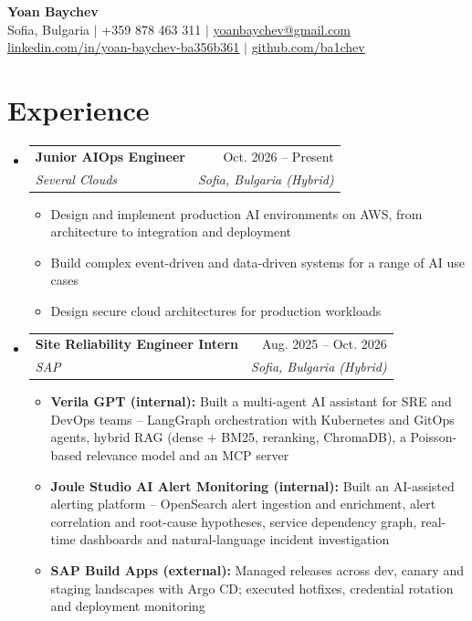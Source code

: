 \documentclass[a4paper,11pt]{article}
\makeatletter
\newcommand{\resumeItem}[1]{
  \item\small{
    {#1 \vspace{-2pt}}
  }
}
\newcommand{\resumeSubheading}[4]{
  \vspace{-2pt}\item
    \begin{tabular*}{0.97\textwidth}[t]{l@{\extracolsep{\fill}}r}
      \textbf{#1} & #2 \\
      \textit{\small#3} & \textit{\small #4} \\
    \end{tabular*}\vspace{-7pt}
}
\newcommand{\resumeSubHeadingListStart}{\begin{itemize}[leftmargin=0.15in, label={}]}
\newcommand{\resumeSubHeadingListEnd}{\end{itemize}}
\newcommand{\resumeItemListStart}{\begin{itemize}}
\newcommand{\resumeItemListEnd}{\end{itemize}\vspace{-5pt}}
\makeatother
\begin{document}
\begin{center}
    \textbf{\Huge Yoan Baychev} \\ \vspace{1pt}
    \small Sofia, Bulgaria $|$ +359 878 463 311 $|$ \href{mailto:yoanbaychev@gmail.com}{\underline{yoanbaychev@gmail.com}} \\
    \href{https://www.linkedin.com/in/yoan-baychev-ba356b361}{\underline{linkedin.com/in/yoan-baychev-ba356b361}} $|$
    \href{https://github.com/ba1chev}{\underline{github.com/ba1chev}}
\end{center}


\section{Experience}
  \resumeSubHeadingListStart

    \resumeSubheading
      {Junior AIOps Engineer}{Oct. 2026 -- Present}
      {Several Clouds}{Sofia, Bulgaria (Hybrid)}
      \resumeItemListStart
        \resumeItem{Design and implement production AI environments on AWS, from architecture to integration and deployment}
        \resumeItem{Build complex event-driven and data-driven systems for a range of AI use cases}
        \resumeItem{Design secure cloud architectures for production workloads}
      \resumeItemListEnd

    \resumeSubheading
      {Site Reliability Engineer Intern}{Aug. 2025 -- Oct. 2026}
      {SAP}{Sofia, Bulgaria (Hybrid)}
      \resumeItemListStart
        \resumeItem{\textbf{Verila GPT (internal):} Built a multi-agent AI assistant for SRE and DevOps teams -- LangGraph orchestration with Kubernetes and GitOps agents, hybrid RAG (dense + BM25, reranking, ChromaDB), a Poisson-based relevance model and an MCP server}
        \resumeItem{\textbf{Joule Studio AI Alert Monitoring (internal):} Built an AI-assisted alerting platform -- OpenSearch alert ingestion and enrichment, alert correlation and root-cause hypotheses, service dependency graph, real-time dashboards and natural-language incident investigation}
        \resumeItem{\textbf{SAP Build Apps (external):} Managed releases across dev, canary and staging landscapes with Argo CD; executed hotfixes, credential rotation and deployment monitoring}
      \resumeItemListEnd

  \resumeSubHeadingListEnd


\end{document}
